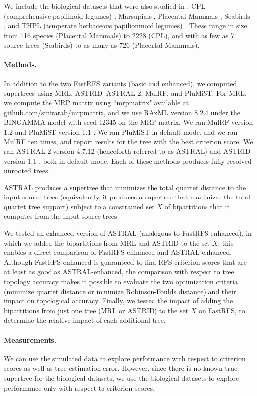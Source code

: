 We include the biological datasets that were  also studied in
\cite{smidgen}:
CPL (comprehensive papilinoid
legumes) \cite{cpl},
Marsupials \cite{marsupial},
Placental Mammals \cite{placental},
Seabirds \cite{kennedy2002seabird}, 
and THPL (temperate herbaceous papilionmoid legumes) \cite{THPL}.
These range 
in size from 116 species (Placental
Mammals) to 2228 (CPL), and with
as few as 7 source trees (Seabirds) to as many as 726 (Placental Mammals).


\paragraph{\bf Methods.  }
In addition to the two FastRFS variants (basic and enhanced),
we computed supertrees using MRL, ASTRID, ASTRAL-2, MulRF, and PluMiST.
For 
MRL, 
we compute 
the MRP matrix using ``mrpmatrix" available at
\url{github.com/smirarab/mrpmatrix}, and we
use
RAxML \cite{RAxML} version 8.2.4
under the BINGAMMA model  with seed 12345 on the MRP matrix.
We ran 
MulRF version 1.2 \cite{mulrf} and
PluMiST version 1.1 \cite{plumist}.
We ran PluMiST in default mode, and we ran
MulRF ten times, and report results for the 
tree with the best criterion score.
We ran
ASTRAL-2 version 4.7.12  \cite{ASTRAL2} (henceforth
referred to as ASTRAL)
and
ASTRID version 1.1 \cite{ASTRID}, both in default mode.
Each of these methods produces fully resolved
unrooted trees.  


ASTRAL produces a supertree  that minimizes the total quartet distance
to the input source trees (equivalently, it produces a supertree that
maximizes the total quartet tree support) subject to a constrained
set $X$ of bipartitions that it computes from the input source
trees.

We tested an enhanced version of
ASTRAL (analogous to FastRFS-enhanced), in which 
we added the bipartitions from MRL and ASTRID 
to the set $X$; this enables a direct comparison of
FastRFS-enhanced and ASTRAL-enhanced. Although
FastRFS-enhanced is guaranteed to find RFS criterion scores
that are at least as good as
ASTRAL-enhanced, the comparison with respect to tree topology accuracy
makes it possible to evaluate the two optimization
criteria (minimize quartet distance or
minimize Robinson-Foulds distance) and their impact on topological accuracy.
Finally, we tested the impact of adding the bipartitions
from just one tree (MRL or ASTRID) to
the set $X$ on FastRFS, to determine the relative impact
of each additional tree.


\paragraph{\bf Measurements. }
We can use the simulated data to explore performance with respect to
criterion scores as well as tree estimation error. 
However, 
since there is no known true
supertree for the biological datasets, we use the biological 
datasets to explore performance only with respect to criterion scores.


